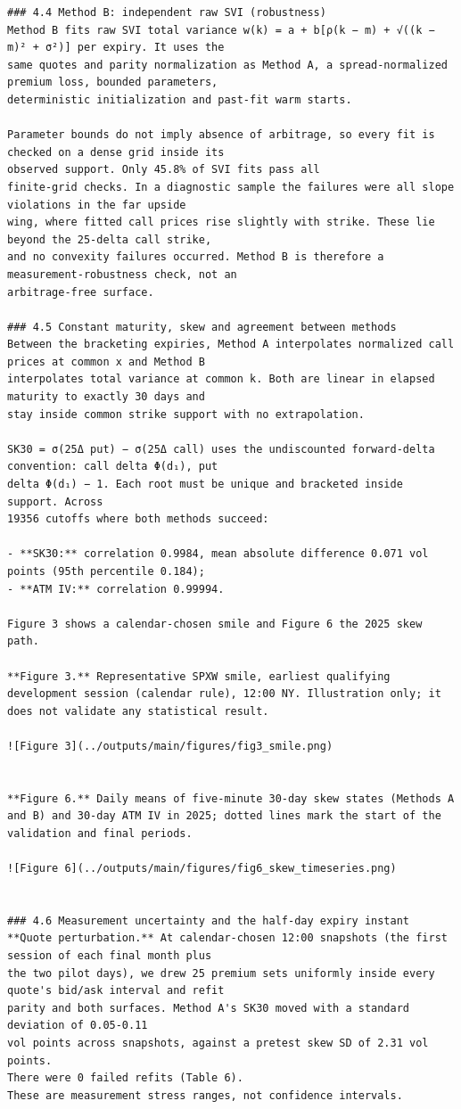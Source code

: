\documentclass[11pt]{article}
\begin{document}
\begin{verbatim}
### 4.4 Method B: independent raw SVI (robustness)
Method B fits raw SVI total variance w(k) = a + b[ρ(k − m) + √((k − m)² + σ²)] per expiry. It uses the
same quotes and parity normalization as Method A, a spread-normalized premium loss, bounded parameters,
deterministic initialization and past-fit warm starts.

Parameter bounds do not imply absence of arbitrage, so every fit is checked on a dense grid inside its
observed support. Only 45.8% of SVI fits pass all
finite-grid checks. In a diagnostic sample the failures were all slope violations in the far upside
wing, where fitted call prices rise slightly with strike. These lie beyond the 25-delta call strike,
and no convexity failures occurred. Method B is therefore a measurement-robustness check, not an
arbitrage-free surface.

### 4.5 Constant maturity, skew and agreement between methods
Between the bracketing expiries, Method A interpolates normalized call prices at common x and Method B
interpolates total variance at common k. Both are linear in elapsed maturity to exactly 30 days and
stay inside common strike support with no extrapolation.

SK30 = σ(25Δ put) − σ(25Δ call) uses the undiscounted forward-delta convention: call delta Φ(d₁), put
delta Φ(d₁) − 1. Each root must be unique and bracketed inside support. Across
19356 cutoffs where both methods succeed:

- **SK30:** correlation 0.9984, mean absolute difference 0.071 vol points (95th percentile 0.184);
- **ATM IV:** correlation 0.99994.

Figure 3 shows a calendar-chosen smile and Figure 6 the 2025 skew path.

**Figure 3.** Representative SPXW smile, earliest qualifying development session (calendar rule), 12:00 NY. Illustration only; it does not validate any statistical result.

![Figure 3](../outputs/main/figures/fig3_smile.png)


**Figure 6.** Daily means of five-minute 30-day skew states (Methods A and B) and 30-day ATM IV in 2025; dotted lines mark the start of the validation and final periods.

![Figure 6](../outputs/main/figures/fig6_skew_timeseries.png)


### 4.6 Measurement uncertainty and the half-day expiry instant
**Quote perturbation.** At calendar-chosen 12:00 snapshots (the first session of each final month plus
the two pilot days), we drew 25 premium sets uniformly inside every quote's bid/ask interval and refit
parity and both surfaces. Method A's SK30 moved with a standard deviation of 0.05-0.11
vol points across snapshots, against a pretest skew SD of 2.31 vol points.
There were 0 failed refits (Table 6).
These are measurement stress ranges, not confidence intervals.


\end{verbatim}
\end{document}
